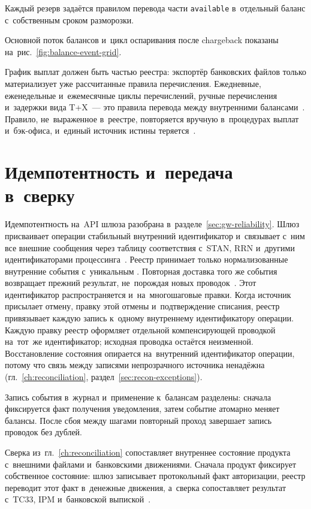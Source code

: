 Каждый резерв задаётся правилом перевода части \texttt{available}
в~отдельный баланс с~собственным сроком разморозки.

Основной поток балансов и~цикл оспаривания после chargeback показаны
на~рис.~\ref{fig:balance-event-grid}.

График выплат должен быть частью реестра: экспортёр банковских файлов только
материализует уже рассчитанные правила перечисления. Ежедневные, еженедельные и~ежемесячные циклы перечислений, ручные
перечисления и~задержки вида T+X~--- это правила перевода между внутренними
балансами~\cite{stripe-payouts}. Правило, не~выраженное в~реестре, повторяется
вручную в~процедурах выплат и~бэк-офиса, и~единый источник истины
теряется~\cite{stripe-minimum-balances,adyen-balances}.

\section{Идемпотентность и~передача в~сверку}\label{sec:ledger-idempotency}

Идемпотентность на~API шлюза разобрана в~разделе~\ref{sec:gw-reliability}. Шлюз
присваивает операции стабильный внутренний идентификатор и~связывает с~ним все
внешние сообщения через таблицу соответствия с~STAN, RRN и~другими
идентификаторами процессинга~\cite{fis-iso8583-guide-2023}. Реестр принимает
только нормализованные внутренние события с~уникальным .
Повторная доставка того же события возвращает прежний результат, не~порождая
новых проводок~\cite{stripe-webhooks}.
Этот идентификатор распространяется и~на~многошаговые правки. Когда источник
присылает отмену, правку этой отмены и~подтверждение списания, реестр
привязывает каждую запись к~одному внутреннему идентификатору операции. Каждую
правку реестр оформляет отдельной компенсирующей проводкой на~тот~же
идентификатор; исходная проводка остаётся неизменной. Восстановление состояния
опирается на~внутренний идентификатор операции, потому что связь между записями
непрозрачного источника ненадёжна (гл.~\ref{ch:reconciliation},
раздел~\ref{sec:recon-exceptions}).

Запись события в~журнал и~применение к~балансам разделены: сначала
фиксируется факт получения уведомления, затем событие атомарно меняет балансы.
После сбоя между шагами повторный проход завершает запись проводок без дублей.

Сверка из~гл.~\ref{ch:reconciliation} сопоставляет внутреннее состояние
продукта с~внешними файлами и~банковскими движениями. Сначала продукт фиксирует
собственное состояние: шлюз записывает протокольный факт авторизации, реестр
переводит этот факт в~денежные движения, а~сверка сопоставляет результат
с~TC33, IPM и~банковской
выпиской~\cite{visa-core-rules,mc-tpr,mc-switching-services}.

